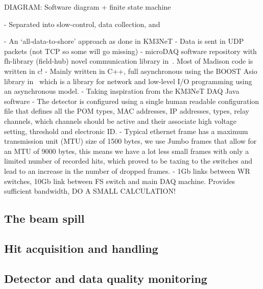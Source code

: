 DIAGRAM: Software diagram + finite state machine

- Separated into slow-control, data collection, and

- An `all-data-to-shore' approach as done in KM3NeT
- Data is sent in UDP packets (not TCP so some will go missing)
- microDAQ software repository with fh-library (field-hub) novel communication library
in~\cite{microdaq2020}. Most of Madison code is written in c!
- Mainly written in C++, full asynchronous using the BOOST Asio library in~\cite{boost2020} which
is a library for network and low-level I/O programming using an asynchronous model.
- Taking inspiration from the KM3NeT DAQ Java software
- The detector is configured using a single human readable configuration file that defines all the
POM types, MAC addresses, IP addresses, types, relay channels, which channels should be active and
their associate high voltage setting, threshold and electronic ID.
- Typical ethernet frame has a maximum transmission unit (MTU) size of 1500 bytes, we use Jumbo
frames that allow for an MTU of 9000 bytes, this means we have a lot less small frames with only a
limited number of recorded hits, which proved to be taxing to the switches and lead to an increase
in the number of dropped frames.
- 1Gb links between WR switches, 10Gb link between FS switch and main DAQ machine. Provides
sufficient bandwidth, DO A SMALL CALCULATION!

\subsection{The beam spill} %
\label{sec:daq_soft_spill} %

\subsection{Hit acquisition and handling} %
\label{sec:daq_soft_hits} %

\subsection{Detector and data quality monitoring} %
\label{sec:daq_soft_monitor} %


